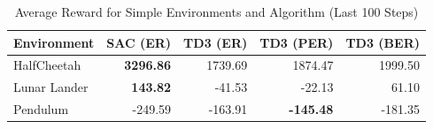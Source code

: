 \begin{table}[H]
\caption{Average Reward for Simple Environments and Algorithm (Last 100 Steps)}\centering {}
\label{tab:avg_reward}
\begin{tabular}{lrrrr}
\toprule
Environment & SAC (ER) & TD3 (ER) & TD3 (PER) & TD3 (BER) \\
\midrule
HalfCheetah & \textbf{3296.86} & 1739.69 & 1874.47 & 1999.50 \\
Lunar Lander & \textbf{143.82} & -41.53 & -22.13 & 61.10 \\
Pendulum & -249.59 & -163.91 & \textbf{-145.48} & -181.35 \\
\bottomrule
\end{tabular}
\end{table}
